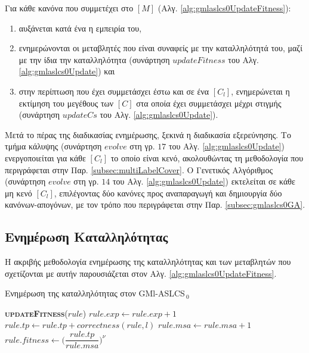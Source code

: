 Για κάθε κανόνα που συμμετέχει στο $[M]$ (Αλγ. \ref{alg:gmlaslcs0UpdateFitness}):

\begin{enumerate}
\item αυξάνεται κατά ένα η εμπειρία του,
\item ενημερώνονται οι μεταβλητές που είναι συναφείς με την καταλληλότητά του, μαζί με την ίδια την καταλληλότητα (συνάρτηση $updateFitness$ του Αλγ. \ref{alg:gmlaslcs0Update}) και
\item στην περίπτωση που έχει συμμετάσχει έστω και σε ένα $[C_{l}]$, ενημερώνεται η εκτίμηση του μεγέθους των $[C]$ στα οποία έχει συμμετάσχει μέχρι στιγμής (συνάρτηση $updateCs$ του Αλγ. \ref{alg:gmlaslcs0Update}).
\end{enumerate}

Μετά το πέρας της διαδικασίας ενημέρωσης, ξεκινά η διαδικασία εξερεύνησης. Το τμήμα κάλυψης (συνάρτηση $evolve$ στη γρ. $17$ του Αλγ. \ref{alg:gmlaslcs0Update}) ενεργοποιείται για κάθε $[C_{l}]$ το οποίο είναι κενό, ακολουθώντας τη μεθοδολογία που περιγράφεται στην Παρ. \ref{subsec:multiLabelCover}. Ο Γενετικός Αλγόριθμος (συνάρτηση $evolve$ στη γρ. $14$ του Αλγ. \ref{alg:gmlaslcs0Update}) εκτελείται σε κάθε μη κενό $[C_{l}]$, επιλέγοντας δύο κανόνες προς αναπαραγωγή και δημιουργία δύο κανόνων-απογόνων, με τον τρόπο που περιγράφεται στην Παρ. \ref{subsec:gmlaslcs0GA}.







\subsection{Ενημέρωση Καταλληλότητας}
\label{subsec:gmlaslcs0update}
Η ακριβής μεθοδολογία ενημέρωσης της καταλληλότητας και των μεταβλητών που σχετίζονται με αυτήν παρουσιάζεται στον Αλγ. \ref{alg:gmlaslcs0UpdateFitness}.

\begin{algorithm} 
 \caption{Ενημέρωση της καταλληλότητας στον GMl-ASLCS$_{\:0}$}
\label{alg:gmlaslcs0UpdateFitness}
 \begin{algorithmic}[1]
  	\STATE \textbf{\textsc{updateFitness}}($rule$)
  	\STATE $rule.exp \gets rule.exp + 1$
  		\STATE $rule.tp \gets rule.tp + correctness(rule, l)$
  		\STATE $rule.msa \gets rule.msa + 1$
  	\ENDFOR
  	\STATE $rule.fitness \gets \Big(\dfrac{rule.tp}{rule.msa}\Big)^{\nu}$

 \end{algorithmic}
\end{algorithm}


